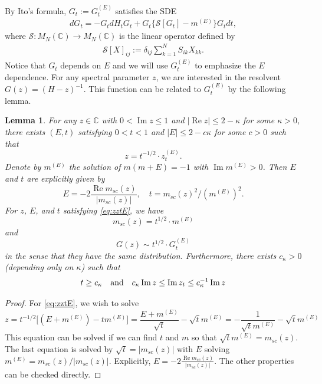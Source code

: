 \documentclass[10pt,reqno]{article}
\DeclareMathOperator{\re}{{\mathrm{Re}}}
\DeclareMathOperator{\im}{{\mathrm{Im}}}
\newcommand{\C}{\mathbb C}
\theoremstyle{plain} %
\newtheorem{lemma}[theorem]{Lemma}
\theoremstyle{remark}
\numberwithin{equation}{section}
\begin{document}
By Ito's formula, $G_{t} := G_{t}^{(E)}$ satisfies the SDE
\begin{align}\nonumber
dG_{t}=-G_{t}dH_{t}G_{t}+G_{t}\{\mathcal{S}[G_{t}]-m^{(E)}\}G_{t}
dt,
\end{align}
where $\mathcal{S}:M_{N}(\C)\to M_{N}(\C)$ is the linear operator defined by
\begin{align*}
\mathcal{S}[X]_{ij}:=\delta_{ij}\sum_{k=1}^{N}S_{ik}X_{kk}.
\end{align*}
Notice that $G_{t}$ depends on $E$ and  we will use $G^{(E)}_{t}$  to emphasize the $E$ dependence. 
 For any spectral parameter $z$, we are interested in the resolvent  $G(z)=(H-z)^{-1} $. This function can be related to $G_{t}^{(E)}$ by the following lemma. 
\begin{lemma}\label{zztE}
    For any $z\in \mathbb C$ with $0 <  \im z\le 1$ and $|\re z|\le  2-\kappa$ for some $\kappa>0$, there exists  $(E, t)$ satisfying $0 <   t<1$ and  $|E|\le 2- c \kappa$ for some $c > 0$  such that
\begin{equation}\label{eq:zztE}
     z=t^{-1/2}\cdot z^{(E)}_t.
\end{equation}
Denote by $m^{(E)} $ the solution of $m (m+  E) =- 1$ with \(\operatorname{Im} m^{(E)}>0\). Then $E$ and $t$ are explicitly given by  
\[
 E =  - 2 \frac {  \re  m_{sc} (z)} {  |m_{sc} (z) |}, \quad t  = m_{sc} (z)^2/(m^{(E)})^2.
\]
For $z$, $E$, and $t$ satisfying \eqref{eq:zztE}, we have 
\begin{equation}\label{mtEmz}
  m_{sc}(z)=t^{1/2}\cdot m^{(E)} %
\end{equation}
and 
   \begin{equation}\label{GtEGz}
    G(z) \sim t^{ 1/2}\cdot G_t^{(E)} 
   \end{equation}
in the sense that they have the same distribution. 
Furthermore, there  exists $c_\kappa>0$ (depending only on $\kappa$) such that 
  \begin{equation}\label{eq:zztE2}
       t\ge c_\kappa \quad {\rm and}\quad  c_\kappa\im z\le \im z_t\le c_\kappa^{-1}\im z
\end{equation} 
\end{lemma}
\begin{proof} For \eqref{eq:zztE}, 
we wish to solve 
\[
z=  t^{-1/2} \big [ (E+m^{(E)})- t  m^{(E)} \big ] =  \frac { E+m^{(E)}} { \sqrt t} - \sqrt  t  m^{(E)} = -  \frac { 1} {  \sqrt t m^{(E)} } -  \sqrt  t  m^{(E)}
\] 
This equation can be solved if  we can find $t$ and $m$ so that  $\sqrt  t  m^{(E)}= m_{sc} (z)$.
The last  equation is solved by $\sqrt t  = |m_{sc} (z)|$ with    $E$  solving   $m^{(E)}  = m_{sc} (z) / |m_{sc} (z) |$. Explicitly,  $E =  - 2 \frac {  \re  m_{sc} (z)} {  |m_{sc} (z) |}$. The other properties can be checked directly.  
\end{proof}
  
\end{document}
